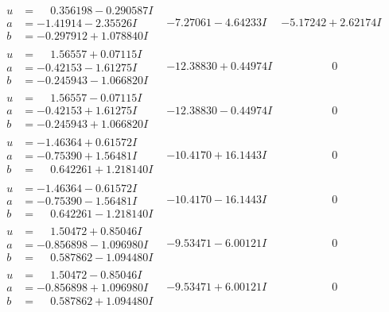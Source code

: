 \documentclass[1p]{elsarticle_modified}
\theoremstyle{definition}
\begin{document}
$$\begin{array}{c|c|c}
\begin{aligned}
u &= \phantom{-}0.356198 - 0.290587 I \\
a &= -1.41914 - 2.35526 I \\
b &= -0.297912 + 1.078840 I\end{aligned}
 & -7.27061 - 4.64233 I & -5.17242 + 2.62174 I \\ \hline\begin{aligned}
u &= \phantom{-}1.56557 + 0.07115 I \\
a &= -0.42153 - 1.61275 I \\
b &= -0.245943 - 1.066820 I\end{aligned}
 & -12.38830 + 0.44974 I & \phantom{-0.000000 } 0 \\ \hline\begin{aligned}
u &= \phantom{-}1.56557 - 0.07115 I \\
a &= -0.42153 + 1.61275 I \\
b &= -0.245943 + 1.066820 I\end{aligned}
 & -12.38830 - 0.44974 I & \phantom{-0.000000 } 0 \\ \hline\begin{aligned}
u &= -1.46364 + 0.61572 I \\
a &= -0.75390 + 1.56481 I \\
b &= \phantom{-}0.642261 + 1.218140 I\end{aligned}
 & -10.4170 + 16.1443 I & \phantom{-0.000000 } 0 \\ \hline\begin{aligned}
u &= -1.46364 - 0.61572 I \\
a &= -0.75390 - 1.56481 I \\
b &= \phantom{-}0.642261 - 1.218140 I\end{aligned}
 & -10.4170 - 16.1443 I & \phantom{-0.000000 } 0 \\ \hline\begin{aligned}
u &= \phantom{-}1.50472 + 0.85046 I \\
a &= -0.856898 - 1.096980 I \\
b &= \phantom{-}0.587862 - 1.094480 I\end{aligned}
 & -9.53471 - 6.00121 I & \phantom{-0.000000 } 0 \\ \hline\begin{aligned}
u &= \phantom{-}1.50472 - 0.85046 I \\
a &= -0.856898 + 1.096980 I \\
b &= \phantom{-}0.587862 + 1.094480 I\end{aligned}
 & -9.53471 + 6.00121 I & \phantom{-0.000000 } 0\\

\end{array}$$
\end{document}
